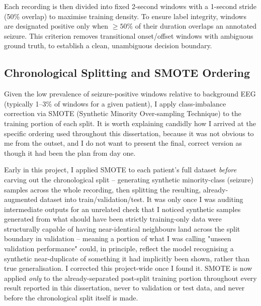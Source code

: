 Each recording is then divided into fixed 2-second windows with a 1-second stride (50\% overlap) to maximise training density. To ensure label integrity, windows are designated positive only when $\ge 50\%$ of their duration overlaps an annotated seizure. This criterion removes transitional onset/offset windows with ambiguous ground truth, to establish a clean, unambiguous decision boundary.


\subsection{Chronological Splitting and SMOTE Ordering}

Given the low prevalence of seizure-positive windows relative to background EEG (typically 1--3\% of windows for a given patient), I apply class-imbalance correction via SMOTE (Synthetic Minority Over-sampling Technique) to the training portion of each split. It is worth explaining candidly how I arrived at the specific ordering used throughout this dissertation, because it was not obvious to me from the outset, and I do not want to present the final, correct version as though it had been the plan from day one.

Early in this project, I applied SMOTE to each patient's full dataset \emph{before} carving out the chronological split -- generating synthetic minority-class (seizure) samples across 
the whole recording, then splitting the resulting, already-augmented dataset into train/validation/test.
It was only once I 
was auditing intermediate outputs for an unrelated check that I noticed synthetic samples generated from what should have been strictly training-only data were structurally capable of 
having near-identical neighbours land across the split boundary in validation -- meaning a portion of what I was calling "unseen validation performance" could, in principle, reflect 
the model recognising a synthetic near-duplicate of something it had implicitly been shown, rather than true generalisation. I corrected this project-wide once 
I found it. SMOTE is now applied \emph{only} to the already-separated post-split training portion throughout every result reported in this dissertation, never to validation or test data, and 
never before the chronological split itself is made.

